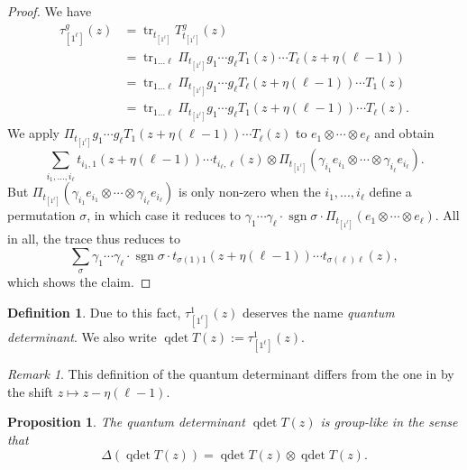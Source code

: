 \documentclass[11pt]{report}
\newtheorem{prop}[theorem]{Proposition}
\theoremstyle{definition}
\newtheorem{definition}[theorem]{Definition}
\theoremstyle{remark}
\newtheorem*{remark}{Remark}
\theoremstyle{remark}
\begin{document}
\begin{proof}
We have
\begin{align*}
\tau_{[1^\ell]}^g(z)
&= \operatorname{tr}_{t_{[1^\ell]}} T_{t_{[1^\ell]}}^g(z) \\
&= \operatorname{tr}_{1...\ell} \Pi_{t_{[1^\ell]}} g_1 \cdots g_\ell T_1(z) \cdots T_\ell(z+\eta(\ell-1)) \\
&= \operatorname{tr}_{1...\ell} \Pi_{t_{[1^\ell]}} g_1 \cdots g_\ell T_\ell(z+\eta(\ell-1)) \cdots T_1(z) \\
&= \operatorname{tr}_{1...\ell} \Pi_{t_{[1^\ell]}} g_1 \cdots g_\ell T_1(z+\eta(\ell-1)) \cdots T_\ell(z).
\end{align*}
We apply $\Pi_{t_{[1^\ell]}} g_1 \cdots g_\ell T_1(z+\eta(\ell-1)) \cdots T_\ell(z)$ to $e_1 \otimes \cdots \otimes e_\ell$ and obtain
\begin{equation*}
\sum_{i_1,...,i_\ell} t_{i_1,1}(z+\eta(\ell-1)) \cdots t_{i_\ell,\ell}(z) \otimes \Pi_{t_{[1^\ell]}} (\gamma_{i_1} e_{i_1} \otimes \cdots \otimes \gamma_{i_\ell} e_{i_\ell}).
\end{equation*}
But $\Pi_{t_{[1^\ell]}} (\gamma_{i_1} e_{i_1} \otimes \cdots \otimes \gamma_{i_\ell} e_{i_\ell})$ is only non-zero when the $i_1,...,i_\ell$ define a permutation $\sigma$, in which case it reduces to $\gamma_1 \cdots \gamma_\ell \cdot \operatorname{sgn} \sigma \cdot \Pi_{t_{[1^\ell]}} (e_1 \otimes \cdots \otimes e_\ell)$. All in all, the trace thus reduces to
\begin{equation*}
\sum_\sigma \gamma_1 \cdots \gamma_\ell \cdot \operatorname{sgn} \sigma \cdot t_{\sigma(1)1}(z+\eta(\ell-1)) \cdots t_{\sigma(\ell)\ell}(z),
\end{equation*}
which shows the claim.
\end{proof}

\begin{definition}
Due to this fact, $\tau_{[1^\ell]}^1(z)$ deserves the name \emph{quantum determinant}. We also write $\operatorname{qdet} T(z) := \tau_{[1^\ell]}^1(z)$.
\end{definition}

\begin{remark}
This definition of the quantum determinant differs from the one in \cite{book:molev} by the shift $z \mapsto z-\eta(\ell-1)$.
\end{remark}

\begin{prop}\label{prop:quantumDetGroupLike}
The quantum determinant $\operatorname{qdet} T(z)$ is group-like in the sense that
\begin{equation*}
\Delta(\operatorname{qdet} T(z)) = \operatorname{qdet} T(z) \otimes \operatorname{qdet} T(z).
\end{equation*}
\end{prop}
\end{document}
